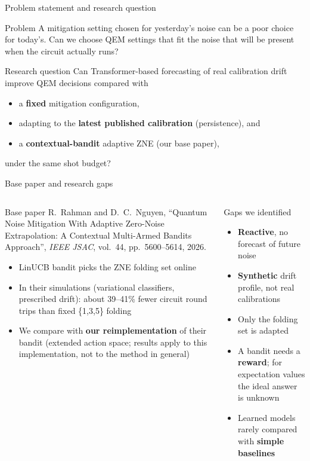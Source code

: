 \documentclass[aspectratio=169,11pt]{beamer}
\begin{document}
\begin{frame}{Problem statement and research question}
\begin{block}{Problem}
A mitigation setting chosen for yesterday's noise can be a poor choice for today's. Can we choose QEM settings that fit the noise that will be present when the circuit actually runs?
\end{block}
\vspace{0.3cm}
\begin{block}{Research question}
Can Transformer-based forecasting of real calibration drift improve QEM decisions compared with
\begin{itemize}
\item a \textbf{fixed} mitigation configuration,
\item adapting to the \textbf{latest published calibration} (persistence), and
\item a \textbf{contextual-bandit} adaptive ZNE (our base paper),
\end{itemize}
under the same shot budget?
\end{block}
\end{frame}

\begin{frame}{Base paper and research gaps}
\footnotesize
\begin{columns}[T]
\begin{block}{Base paper}
R.~Rahman and D.~C.~Nguyen, ``Quantum Noise Mitigation With Adaptive Zero-Noise Extrapolation: A Contextual Multi-Armed Bandits Approach'', \textit{IEEE JSAC}, vol.~44, pp.~5600--5614, 2026.
\begin{itemize}
\item LinUCB bandit picks the ZNE folding set online
\item In their simulations (variational classifiers, prescribed drift): about 39--41\% fewer circuit round trips than fixed \{1,3,5\} folding
\item We compare with \textbf{our reimplementation} of their bandit (extended action space; results apply to this implementation, not to the method in general)
\end{itemize}
\end{block}
\begin{alertblock}{Gaps we identified}
\begin{itemize}
\item \textbf{Reactive}, no forecast of future noise
\item \textbf{Synthetic} drift profile, not real calibrations
\item Only the folding set is adapted
\item A bandit needs a \textbf{reward}; for expectation values the ideal answer is unknown
\item Learned models rarely compared with \textbf{simple baselines}
\end{itemize}
\end{alertblock}
\end{columns}
\end{frame}
\end{document}

